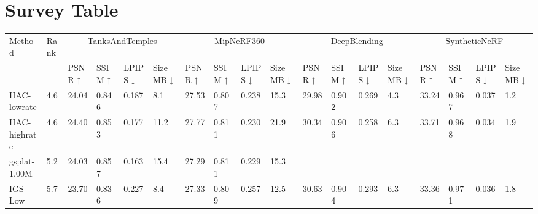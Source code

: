 \section*{Survey Table}

{
\footnotesize
\setlength{\tabcolsep}{3pt}

\begin{adjustbox}{center}
\begin{tabular}{ll|llll|llll|llll|llll}
\toprule
Method & Rank & \multicolumn{4}{c|}{TanksAndTemples} & \multicolumn{4}{c|}{MipNeRF360} & \multicolumn{4}{c|}{DeepBlending} & \multicolumn{4}{c}{SyntheticNeRF} \\
 & \tiny  & \tiny PSNR$\uparrow$ & \tiny SSIM$\uparrow$ & \tiny LPIPS$\downarrow$ & \tiny \makecell{Size \\ MB$\downarrow$} & \tiny PSNR$\uparrow$ & \tiny SSIM$\uparrow$ & \tiny LPIPS$\downarrow$ & \tiny \makecell{Size \\ MB$\downarrow$} & \tiny PSNR$\uparrow$ & \tiny SSIM$\uparrow$ & \tiny LPIPS$\downarrow$ & \tiny \makecell{Size \\ MB$\downarrow$} & \tiny PSNR$\uparrow$ & \tiny SSIM$\uparrow$ & \tiny LPIPS$\downarrow$ & \tiny \makecell{Size \\ MB$\downarrow$} \\
\midrule
HAC-lowrate & \cellcolor{lightred}4.6 & 24.04 & 0.846 & \cellcolor{lightyellow}0.187 & \cellcolor{lightred}8.1 & 27.53 & 0.807 & 0.238 & \cellcolor{lightorange}15.3 & 29.98 & 0.902 & 0.269 & \cellcolor{lightred}4.3 & 33.24 & 0.967 & 0.037 & \cellcolor{lightred}1.2 \\
HAC-highrate & \cellcolor{lightred}4.6 & \cellcolor{lightyellow}24.40 & \cellcolor{lightyellow}0.853 & \cellcolor{lightorange}0.177 & 11.2 & \cellcolor{lightorange}27.77 & 0.811 & 0.230 & 21.9 & 30.34 & 0.906 & 0.258 & \cellcolor{lightyellow}6.3 & \cellcolor{lightorange}33.71 & 0.968 & 0.034 & \cellcolor{lightyellow}1.9 \\
gsplat-1.00M & \cellcolor{lightorange}5.2 & 24.03 & \cellcolor{lightorange}0.857 & \cellcolor{lightred}0.163 & 15.4 & 27.29 & 0.811 & \cellcolor{lightyellow}0.229 & \cellcolor{lightorange}15.3 &  &  &  &  &  &  &  &  \\
IGS-Low & \cellcolor{lightyellow}5.7 & 23.70 & 0.836 & 0.227 & \cellcolor{lightyellow}8.4 & 27.33 & 0.809 & 0.257 & \cellcolor{lightred}12.5 & \cellcolor{lightorange}30.63 & 0.904 & 0.293 & \cellcolor{lightyellow}6.3 & 33.36 & \cellcolor{lightorange}0.971 & 0.036 & \cellcolor{lightorange}1.8 \\

\end{tabular}
\end{adjustbox}}

